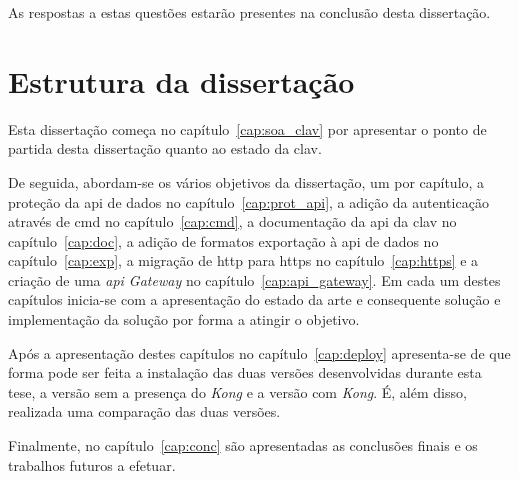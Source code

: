 As respostas a estas questões estarão presentes na conclusão desta dissertação.

\section{Estrutura da dissertação}

Esta dissertação começa no capítulo~\ref{cap:soa_clav} por apresentar o ponto de partida desta dissertação quanto ao estado da \acrshort{clav}. 

De seguida, abordam-se os vários objetivos da dissertação, um por capítulo, a proteção da \acrshort{api} de dados no capítulo~\ref{cap:prot_api}, a adição da autenticação através de \acrshort{cmd} no capítulo~\ref{cap:cmd}, a documentação da \acrshort{api} da \acrshort{clav} no capítulo~\ref{cap:doc}, a adição de formatos exportação à \acrshort{api} de dados no capítulo~\ref{cap:exp}, a migração de \acrshort{http} para \acrshort{https} no capítulo~\ref{cap:https} e a criação de uma \textit{\acrshort{api} Gateway} no capítulo~\ref{cap:api_gateway}. Em cada um destes capítulos inicia-se com a apresentação do estado da arte e consequente solução e implementação da solução por forma a atingir o objetivo.

Após a apresentação destes capítulos no capítulo~\ref{cap:deploy} apresenta-se de que forma pode ser feita a instalação das duas versões desenvolvidas durante esta tese, a versão sem a presença do \textit{Kong} e a versão com \textit{Kong}. É, além disso, realizada uma comparação das duas versões.

Finalmente, no capítulo~\ref{cap:conc} são apresentadas as conclusões finais e os trabalhos futuros a efetuar.